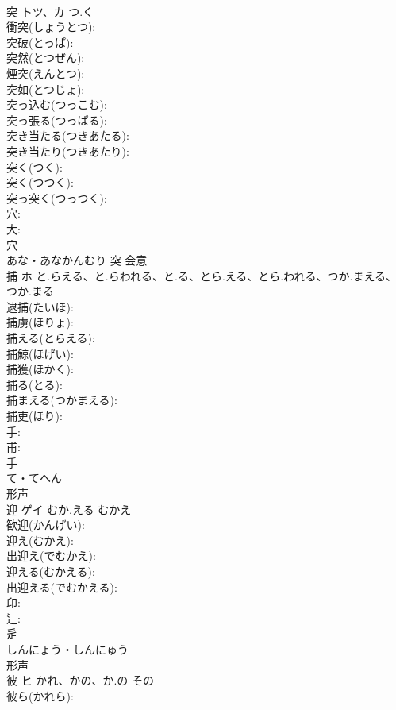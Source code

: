 \documentclass[8pt]{extreport}
\begin{document}
\begin{CJK}{UTF8}{min}
\\	突	トツ、カ	つ.く		
\\	衝突(しょうとつ): 
\\	突破(とっぱ): 
\\	突然(とつぜん): 
\\	煙突(えんとつ): 
\\	突如(とつじょ): 
\\	突っ込む(つっこむ): 
\\	突っ張る(つっぱる): 
\\	突き当たる(つきあたる): 
\\	突き当たり(つきあたり): 
\\	突く(つく): 
\\	突く(つつく): 
\\	突っ突く(つっつく): 
\\	穴: 
\\	大: 
\\	穴	
\\	あな・あなかんむり	突	会意 
\\	捕	ホ	と.らえる、と.らわれる、と.る、とら.える、とら.われる、つか.まえる、つか.まる		
\\	逮捕(たいほ): 
\\	捕虜(ほりょ): 
\\	捕える(とらえる): 
\\	捕鯨(ほげい): 
\\	捕獲(ほかく): 
\\	捕る(とる): 
\\	捕まえる(つかまえる): 
\\	捕吏(ほり): 
\\	手: 
\\	甫: 
\\	手	
\\	て・てへん	
\\	形声 
\\	迎	ゲイ	むか.える	むかえ	
\\	歓迎(かんげい): 
\\	迎え(むかえ): 
\\	出迎え(でむかえ): 
\\	迎える(むかえる): 
\\	出迎える(でむかえる): 
\\	卬: 
\\	辶: 
\\	辵	
\\	しんにょう・しんにゅう	
\\	形声 
\\	彼	ヒ	かれ、かの、か.の	その	
\\	彼ら(かれら): 

\end{CJK}
\end{document}
